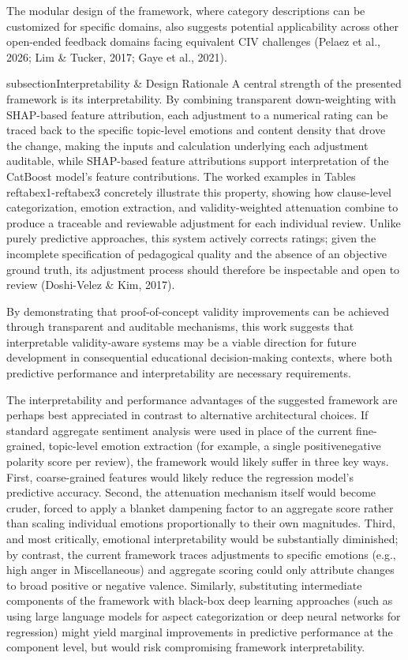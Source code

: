 The modular design of the framework, where category descriptions can be customized for specific domains, also suggests potential applicability across other open-ended feedback domains facing equivalent CIV challenges (Pelaez et al., 2026; Lim & Tucker, 2017; Gaye et al., 2021).

subsection{Interpretability & Design Rationale}
A central strength of the presented framework is its interpretability. By combining transparent down-weighting with
SHAP-based feature attribution, each adjustment to a numerical rating can be traced back to the specific topic-level
emotions and content density that drove the change, making the inputs and calculation underlying each adjustment auditable, while SHAP-based feature attributions support interpretation of the CatBoost model's feature contributions. The worked examples in Tables ref{tabex1}-ref{tabex3} concretely illustrate this property, showing how clause-level categorization, emotion extraction, and validity-weighted attenuation combine to produce a traceable and reviewable adjustment for each individual review. Unlike purely predictive approaches, this system actively corrects ratings; given the incomplete specification of pedagogical quality and the absence of an objective ground truth, its adjustment process should therefore be inspectable and open to review (Doshi-Velez & Kim, 2017). 

By demonstrating that proof-of-concept validity improvements can be achieved through transparent and auditable mechanisms, this work suggests that interpretable validity-aware systems may be a viable direction for future development in consequential educational decision-making contexts, where both predictive performance and interpretability are necessary requirements.

The interpretability and performance advantages of the suggested framework are perhaps best appreciated in contrast to alternative architectural choices. If standard aggregate sentiment analysis were used in place of the current fine-grained, topic-level emotion extraction (for example, a single positivenegative polarity score per review), the framework would likely suffer in three key ways. First, coarse-grained features would likely reduce the regression model's predictive accuracy. Second, the attenuation mechanism itself would become cruder, forced to apply a blanket dampening factor to an aggregate score rather than scaling individual emotions proportionally to their own magnitudes. Third, and most critically, emotional interpretability would be substantially diminished; by contrast, the current framework traces adjustments to specific emotions (e.g., high anger in Miscellaneous) and aggregate scoring could only attribute changes to broad positive or negative valence. Similarly, substituting intermediate components of the framework with black-box deep learning approaches (such as using large language models for aspect categorization or deep neural networks for regression) might yield marginal improvements in predictive performance at the component level, but would risk compromising framework interpretability.

